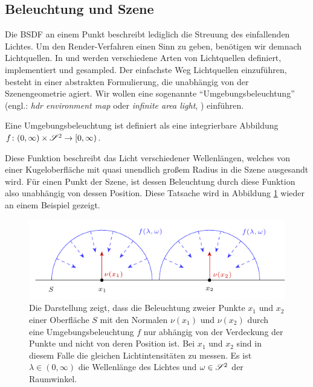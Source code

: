 
	\subsection{Beleuchtung und Szene} %
	\label{sub:beleuchtung_und_szene}

		Die BSDF an einem Punkt beschreibt lediglich die Streuung des einfallenden Lichtes.
		Um den Render-Verfahren einen Sinn zu geben, benötigen wir demnach Lichtquellen.
		In \cite[S.~707~ff]{pbrt3} und \cite{course-photon-map} werden verschiedene Arten von Lichtquellen definiert, implementiert und gesampled.
		Der einfachste Weg Lichtquellen einzuführen, besteht in einer abstrakten Formulierung, die unabhängig von der Szenengeometrie agiert.
		Wir wollen eine sogenannte \enquote{Umgebungsbeleuchtung} (engl.: \textit{hdr environment map} oder \textit{infinite area light}, \cite[S.~737~f]{pbrt3}) einführen.
		\begin{definition}[Umgebungsbeleuchtung]
			Eine Umgebungsbeleuchtung ist definiert als eine integrierbare Abbildung $f\colon(0,\infty)\times\mathscr{S}^{2}\to[0,\infty)$.
		\end{definition}

		Diese Funktion beschreibt das Licht verschiedener Wellenlängen, welches von einer Kugeloberfläche mit quasi unendlich großem Radius in die Szene ausgesandt wird.
		Für einen Punkt der Szene, ist dessen Beleuchtung durch diese Funktion also unabhängig von dessen Position.
		Diese Tatsache wird in Abbildung \ref{fig:hdr_environment_map} wieder an einem Beispiel gezeigt.

		\begin{figure}[h]
			\center
			\includegraphics{gg_fig/hdr_environment_map_1.pdf}
			\caption{Die Darstellung zeigt, dass die Beleuchtung zweier Punkte $x_1$ und $x_2$ einer Oberfläche $S$ mit den Normalen $\nu(x_1)$ und $\nu(x_2)$ durch eine Umgebungsbeleuchtung $f$ nur abhängig von der Verdeckung der Punkte und nicht von deren Position ist. Bei $x_1$ und $x_2$ sind in diesem Falle die gleichen Lichtintensitäten zu messen. Es ist $\lambda\in(0,\infty)$ die Wellenlänge des Lichtes und $\omega\in\mathscr{S}^{2}$ der Raumwinkel.}
			\label{fig:hdr_environment_map}
		\end{figure}

